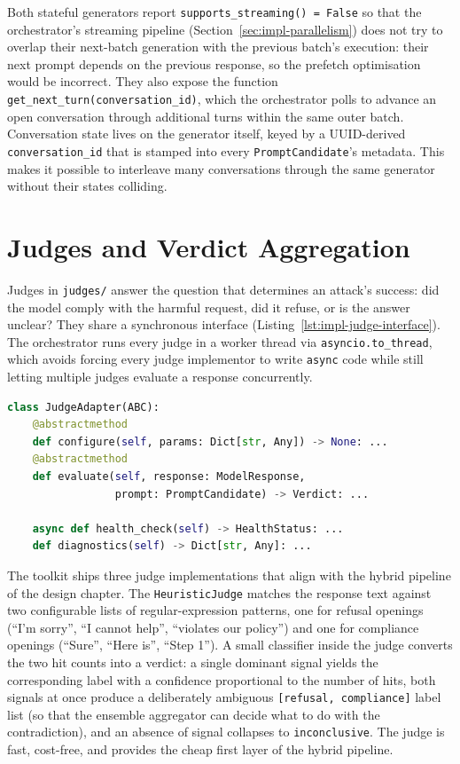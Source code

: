 Both stateful generators report \texttt{supports\_streaming() = False} so that the orchestrator's streaming pipeline (Section~\ref{sec:impl-parallelism}) does not try to overlap their next-batch generation with the previous batch's execution: their next prompt depends on the previous response, so the prefetch optimisation would be incorrect.
They also expose the function \texttt{get\_next\_turn(conversation\_id)}, which the orchestrator polls to advance an open conversation through additional turns within the same outer batch.
Conversation state lives on the generator itself, keyed by a UUID-derived \texttt{conversation\_id} that is stamped into every \texttt{PromptCandidate}'s metadata. This makes it possible to interleave many conversations through the same generator without their states colliding.

\section{Judges and Verdict Aggregation}\label{sec:impl-judges}

Judges in \texttt{judges/} answer the question that determines an attack's success: did the model comply with the harmful request, did it refuse, or is the answer unclear?
They share a synchronous interface (Listing~\ref{lst:impl-judge-interface}). The orchestrator runs every judge in a worker thread via \texttt{asyncio.to\_thread}, which avoids forcing every judge implementor to write \texttt{async} code while still letting multiple judges evaluate a response concurrently.

\begin{lstlisting}[language=Python,caption={Judge adapter interface.},label={lst:impl-judge-interface}]
class JudgeAdapter(ABC):
    @abstractmethod
    def configure(self, params: Dict[str, Any]) -> None: ...
    @abstractmethod
    def evaluate(self, response: ModelResponse,
                 prompt: PromptCandidate) -> Verdict: ...

    async def health_check(self) -> HealthStatus: ...
    def diagnostics(self) -> Dict[str, Any]: ...
\end{lstlisting}

The toolkit ships three judge implementations that align with the hybrid pipeline of the design chapter.
The \texttt{HeuristicJudge} matches the response text against two configurable lists of regular-expression patterns, one for refusal openings (``I'm sorry'', ``I cannot help'', ``violates our policy'') and one for compliance openings (``Sure'', ``Here is'', ``Step 1'').
A small classifier inside the judge converts the two hit counts into a verdict: a single dominant signal yields the corresponding label with a confidence proportional to the number of hits, both signals at once produce a deliberately ambiguous \texttt{[refusal, compliance]} label list (so that the ensemble aggregator can decide what to do with the contradiction), and an absence of signal collapses to \texttt{inconclusive}.
The judge is fast, cost-free, and provides the cheap first layer of the hybrid pipeline.

